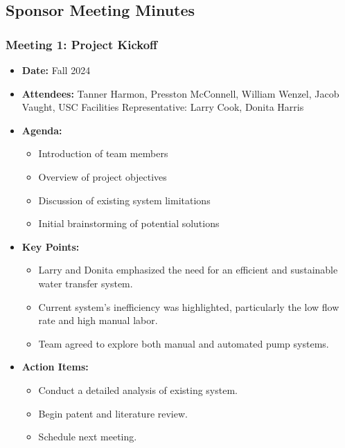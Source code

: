 \documentclass[12pt]{article}
\begin{document}
    \subsection{Sponsor Meeting Minutes}
    \subsubsection{Meeting 1: Project Kickoff}
    \begin{itemize}
        \item \textbf{Date:} Fall 2024
        \item \textbf{Attendees:} Tanner Harmon, Presston McConnell, William Wenzel, Jacob Vaught, USC Facilities Representative: Larry Cook, Donita Harris
        \item \textbf{Agenda:}
        \begin{itemize}
            \item Introduction of team members
            \item Overview of project objectives
            \item Discussion of existing system limitations
            \item Initial brainstorming of potential solutions
        \end{itemize}
        \item \textbf{Key Points:}
        \begin{itemize}
            \item Larry and Donita emphasized the need for an efficient and sustainable water transfer system.
            \item Current system's inefficiency was highlighted, particularly the low flow rate and high manual labor.
            \item Team agreed to explore both manual and automated pump systems.
        \end{itemize}
        \item \textbf{Action Items:}
        \begin{itemize}
            \item Conduct a detailed analysis of existing system.
            \item Begin patent and literature review.
            \item Schedule next meeting.
        \end{itemize}
    \end{itemize}
\end{document}
